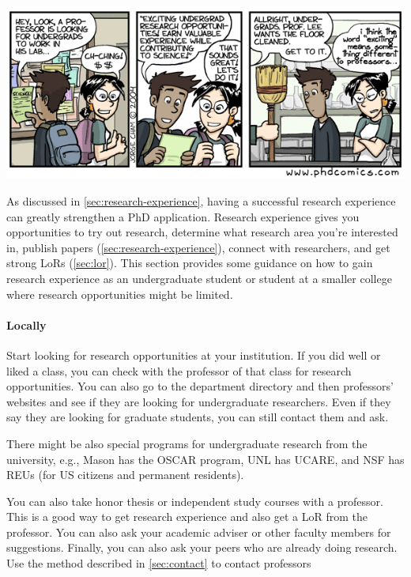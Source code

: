 \documentclass[oneside,11pt,dvipsnames]{book}
\begin{document}
\begin{center}
    \includegraphics[scale=0.5]{files/phd100404s.png}
  \end{center}

As discussed in \autoref{sec:research-experience}, having a successful research experience can greatly strengthen a PhD application. Research experience gives you opportunities to try out research, determine what research area you're interested in, publish papers (\autoref{sec:research-experience}), connect with researchers, and get strong LoRs (\autoref{sec:lor}). This section provides some guidance on how to gain research experience as an undergraduate student or student at a smaller college where research opportunities might be limited.

\paragraph{Locally} Start looking for research opportunities at your institution.
If you did well or liked a class, you can check with the professor of that class for research opportunities.
You can also go to the department directory and then professors' websites and see if they are looking for undergraduate researchers.
Even if they say they are looking for graduate students, you can still contact them and ask.

There might be also special programs for undergraduate research from the university, e.g., Mason has the OSCAR program, UNL has UCARE, and NSF has REUs (for US citizens and permanent residents).

You can also take honor thesis or independent study courses with a professor.  This is a good way to get research experience and also get a LoR from the professor.  You can also ask your academic adviser or other faculty members for suggestions.  Finally, you can also ask your peers who are already doing research.  Use the method described in \autoref{sec:contact} to contact professors
\end{document}
